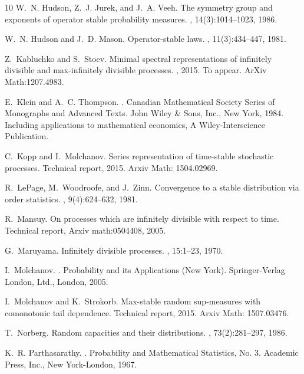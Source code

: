\documentclass[12pt]{amsart}
\numberwithin{equation}{section}
\numberwithin{figure}{section}
\theoremstyle{plain} \newtheorem{theorem}{Theorem}[section]
\theoremstyle{plain} \newtheorem{proposition}[theorem]{Proposition}
\theoremstyle{plain} \newtheorem{lemma}[theorem]{Lemma}
\theoremstyle{plain} \newtheorem{corollary}[theorem]{Corollary}
\theoremstyle{definition} \newtheorem{definition}[theorem]{Definition}
\theoremstyle{definition} \newtheorem{notation}[theorem]{Notation}
\theoremstyle{remark} \newtheorem{remark}[theorem]{Remark}
\theoremstyle{remark} \newtheorem{example}[theorem]{Example}
\theoremstyle{definition} \newtheorem{assumption}{Assumption}
\begin{document}
\begin{thebibliography}{10}
W.~N. Hudson, Z.~J. Jurek, and J.~A. Veeh.
\newblock The symmetry group and exponents of operator stable probability
  measures.
, 14(3):1014--1023, 1986.

W.~N. Hudson and J.~D. Mason.
\newblock Operator-stable laws.
, 11(3):434--447, 1981.

Z.~Kabluchko and S.~Stoev.
\newblock Minimal spectral representations of infinitely divisible and
  max-infinitely divisible processes.
, 2015.
\newblock To appear. ArXiv Math:1207.4983.

E.~Klein and A.~C. Thompson.
.
\newblock Canadian Mathematical Society Series of Monographs and Advanced
  Texts. John Wiley \& Sons, Inc., New York, 1984.
\newblock Including applications to mathematical economics, A
  Wiley-Interscience Publication.

C.~Kopp and I.~Molchanov.
\newblock Series representation of time-stable stochastic processes.
\newblock Technical report, 2015.
\newblock Arxiv Math: 1504.02969.

R.~LePage, M.~Woodroofe, and J.~Zinn.
\newblock Convergence to a stable distribution via order statistics.
, 9(4):624--632, 1981.

R.~Mansuy.
\newblock On processes which are infinitely divisible with respect to time.
\newblock Technical report, Arxiv math:0504408, 2005.

G.~Maruyama.
\newblock Infinitely divisible processes.
, 15:1--23, 1970.

I.~Molchanov.
.
\newblock Probability and its Applications (New York). Springer-Verlag London,
  Ltd., London, 2005.

I.~Molchanov and K.~Strokorb.
\newblock Max-stable random sup-measures with comonotonic tail dependence.
\newblock Technical report, 2015.
\newblock Arxiv Math: 1507.03476.

T.~Norberg.
\newblock Random capacities and their distributions.
, 73(2):281--297, 1986.

K.~R. Parthasarathy.
.
\newblock Probability and Mathematical Statistics, No. 3. Academic Press, Inc.,
  New York-London, 1967.


\end{thebibliography}
\end{document}
